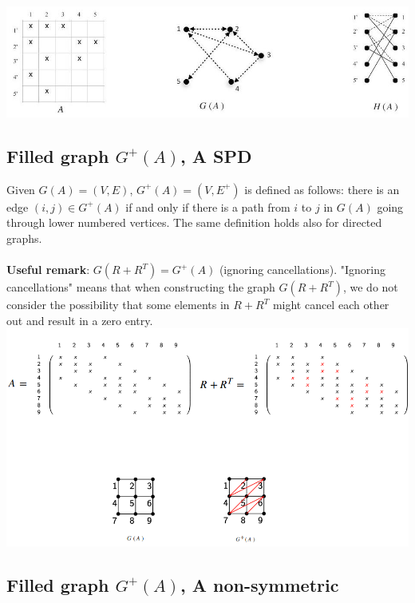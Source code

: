 \documentclass[11pt]{book}
\begin{document}
\includegraphics[scale = 0.4, center]{2023_09_05_b72ccc85584d9dc6fb5cg-226}

\subsection*{Filled graph $G^{+}(A)$, A SPD}

Given $G(A)=(V, E)$, $G^{+}(A)=\left(V, E^{+}\right)$ is defined as follows: there is an edge $(i, j) \in G^{+}(A)$ if and only if there is a path from $i$ to $j$ in $G(A)$ going through lower numbered vertices. The same definition holds also for directed graphs.\\ \\ 
\textbf{Useful remark}: $G\left(R+R^T\right)=G^{+}(A)$ (ignoring cancellations). "Ignoring cancellations" means that when constructing the graph $G\left(R+R^T\right)$, we do not consider the possibility that some elements in $R+R^T$ might cancel each other out and result in a zero entry. \\
\includegraphics[max width=\textwidth, center]{images/Screen0.png}


\subsection*{Filled graph $G^{+}(A)$, A non-symmetric}
\end{document}
